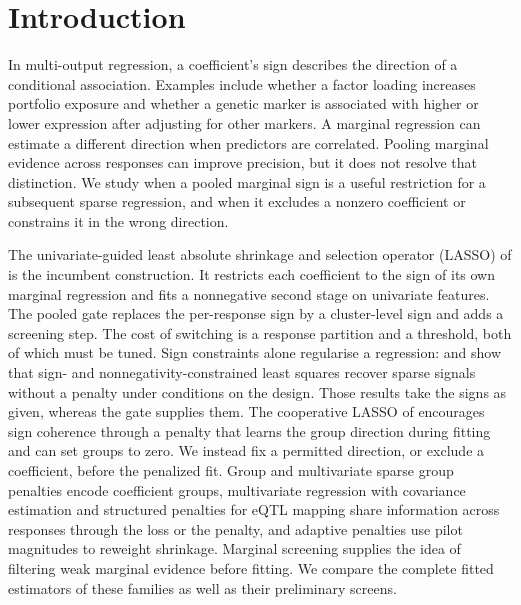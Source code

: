 \documentclass[lineno,pdflatex,sn-basic]{sn-jnl}
\theoremstyle{thmstyleone}
\begin{document}
\section{Introduction} \label{sec:intro}

In multi-output regression, a coefficient's sign describes the direction of a
conditional association. Examples include whether a factor loading increases
portfolio exposure \citep{sepp2026rosaa} and whether a genetic marker is associated
with higher or lower expression after adjusting for other markers. A marginal
regression can estimate a different direction when predictors are correlated.
Pooling marginal evidence across responses can improve precision, but it does
not resolve that distinction. We study when a pooled marginal sign is a useful
restriction for a subsequent sparse regression, and when it excludes a
nonzero coefficient or constrains it in the wrong direction.

The univariate-guided least absolute shrinkage and selection operator (LASSO) of
\citet{Chatterjee+Hastie+Tibshirani:2025} is the incumbent construction. It
restricts each coefficient to the sign of its own marginal regression and fits
a nonnegative second stage on univariate features. The pooled gate replaces
the per-response sign by a cluster-level sign and adds a screening step. The
cost of switching is a response partition and a threshold, both of which must
be tuned. Sign constraints alone regularise a regression:
\citet{Meinshausen:2013} and \citet{Slawski+Hein:2013} show that sign- and
nonnegativity-constrained least squares recover sparse signals without a
penalty under conditions on the design. Those results take the signs as given,
whereas the gate supplies them. The cooperative LASSO of
\citet{Chiquet+Grandvalet+Charbonnier:2012} encourages sign coherence through a
penalty that learns the group direction during fitting and can set groups to
zero. We instead fix a permitted direction, or exclude a coefficient, before
the penalized fit. Group and multivariate sparse group penalties
\citep{Yuan+Lin:2006,Obozinski+Taskar+Jordan:2010,Li+Nan+Zhu:2015} encode
coefficient groups, multivariate regression with covariance estimation
\citep{Rothman+Levina+Zhu:2010} and structured penalties for eQTL mapping
\citep{Peng+etal:2010,Kim+Xing:2012} share information across responses
through the loss or the penalty, and adaptive penalties
\citep{Zou:2006,Wang+Leng:2008} use pilot magnitudes to reweight shrinkage.
Marginal screening \citep{Fan+Lv:2008} supplies the idea of filtering weak
marginal evidence before fitting. We compare the complete fitted estimators of
these families as well as their preliminary screens.
\end{document}
